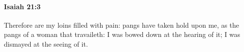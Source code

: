 
		\paragraph{Isaiah 21:3} %
			\label{ISAIAH-21-3}

			Therefore are my loins filled with pain: pangs have taken hold upon me, as the pangs of a woman that travaileth: I was bowed down at the hearing of it; I was dismayed at the seeing of it.


